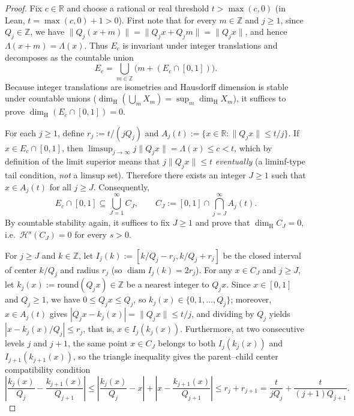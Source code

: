 \documentclass[11pt]{article}
\theoremstyle{definition}
\theoremstyle{remark}
\newcommand{\R}{\mathbb{R}}
\newcommand{\Z}{\mathbb{Z}}
\newcommand{\dimH}{\dim_{\mathrm{H}}}
\newcommand{\Lam}{\Lambda}
\begin{document}
\begin{proof}
Fix $c\in\R$ and choose a rational or real threshold $t>\max(c,0)$ (in Lean,
$t=\max(c,0)+1>0$). First note that for every $m\in\Z$ and $j\ge1$, since
$Q_j\in\Z$, we have $\|Q_j(x+m)\|=\|Q_jx+Q_jm\|=\|Q_jx\|$, and hence
$\Lam(x+m)=\Lam(x)$. Thus $E_c$ is invariant under integer translations and
decomposes as the countable union
\[
E_c=\bigcup_{m\in\Z}\bigl(m+(E_c\cap[0,1])\bigr).
\]
Because integer translations are isometries and Hausdorff dimension is stable
under countable unions ($\dimH(\bigcup_m X_m)=\sup_m\dimH X_m$), it suffices to
prove $\dimH(E_c\cap[0,1])=0$.

For each $j\ge1$, define $r_j:=t/(jQ_j)$ and
$A_j(t):=\{x\in\R:\|Q_jx\|\le t/j\}$. If $x\in E_c\cap[0,1]$, then
$\limsup_{j\to\infty}j\|Q_jx\|=\Lam(x)\le c<t$, which by definition of the limit
superior means that $j\|Q_jx\|\le t$ \emph{eventually} (a liminf-type tail
condition, \emph{not} a limsup set). Therefore there exists an integer $J\ge1$
such that $x\in A_j(t)$ for all $j\ge J$. Consequently,
\[
E_c\cap[0,1]\subseteq\bigcup_{J=1}^\infty C_J,\qquad
C_J:=[0,1]\cap\bigcap_{j=J}^\infty A_j(t).
\]
By countable stability again, it suffices to fix $J\ge1$ and prove that
$\dimH C_J=0$, i.e.\ $\mathcal H^s(C_J)=0$ for every $s>0$.

For $j\ge J$ and $k\in\Z$, let $I_j(k):=[k/Q_j-r_j,k/Q_j+r_j]$ be the closed
interval of center $k/Q_j$ and radius $r_j$ (so $\operatorname{diam}I_j(k)=2r_j$).
For any $x\in C_J$ and $j\ge J$, let $k_j(x):=\mathrm{round}(Q_jx)\in\Z$ be a
nearest integer to $Q_jx$. Since $x\in[0,1]$ and $Q_j\ge1$, we have
$0\le Q_jx\le Q_j$, so $k_j(x)\in\{0,1,\dots,Q_j\}$; moreover, $x\in A_j(t)$
gives $|Q_jx-k_j(x)|=\|Q_jx\|\le t/j$, and dividing by $Q_j$ yields
$|x-k_j(x)/Q_j|\le r_j$, that is, $x\in I_j(k_j(x))$. Furthermore, at two
consecutive levels $j$ and $j+1$, the same point $x\in C_J$ belongs to both
$I_j(k_j(x))$ and $I_{j+1}(k_{j+1}(x))$, so the triangle inequality gives the
parent--child center compatibility condition
\begin{equation}\label{eq:parent-child-tri}
\left|\frac{k_j(x)}{Q_j}-\frac{k_{j+1}(x)}{Q_{j+1}}\right|
\le\left|\frac{k_j(x)}{Q_j}-x\right|+\left|x-\frac{k_{j+1}(x)}{Q_{j+1}}\right|
\le r_j+r_{j+1}=\frac{t}{jQ_j}+\frac{t}{(j+1)Q_{j+1}}.
\end{equation}


\end{proof}
\end{document}
